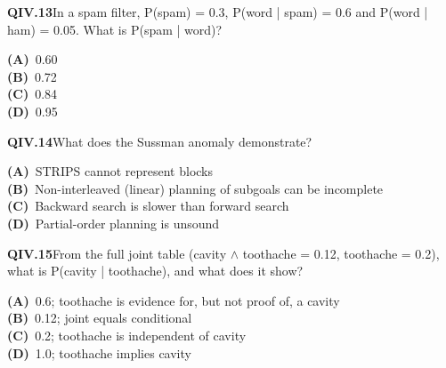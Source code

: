\begin{tcolorbox}[enhanced,breakable,colback=white,colframe=navyL,arc=2mm,boxrule=0.7pt,left=3mm,right=3mm,top=2mm,bottom=2mm]
\textbf{\color{navy}QIV.13}\quad In a spam filter, P(spam) = 0.3, P(word | spam) = 0.6 and P(word | ham) = 0.05. What is P(spam | word)?\hfill{}\par\smallskip
{\small \textbf{\color{navyL}(A)}\ 0.60\\[1pt]\textbf{\color{navyL}(B)}\ 0.72\\[1pt]\textbf{\color{navyL}(C)}\ 0.84\\[1pt]\textbf{\color{navyL}(D)}\ 0.95}
\end{tcolorbox}
\begin{tcolorbox}[enhanced,breakable,colback=white,colframe=navyL,arc=2mm,boxrule=0.7pt,left=3mm,right=3mm,top=2mm,bottom=2mm]
\textbf{\color{navy}QIV.14}\quad What does the Sussman anomaly demonstrate?\hfill{}\par\smallskip
{\small \textbf{\color{navyL}(A)}\ STRIPS cannot represent blocks\\[1pt]\textbf{\color{navyL}(B)}\ Non-interleaved (linear) planning of subgoals can be incomplete\\[1pt]\textbf{\color{navyL}(C)}\ Backward search is slower than forward search\\[1pt]\textbf{\color{navyL}(D)}\ Partial-order planning is unsound}
\end{tcolorbox}
\begin{tcolorbox}[enhanced,breakable,colback=white,colframe=navyL,arc=2mm,boxrule=0.7pt,left=3mm,right=3mm,top=2mm,bottom=2mm]
\textbf{\color{navy}QIV.15}\quad From the full joint table (cavity $\wedge$ toothache = 0.12, toothache = 0.2), what is P(cavity | toothache), and what does it show?\hfill{}\par\smallskip
{\small \textbf{\color{navyL}(A)}\ 0.6; toothache is evidence for, but not proof of, a cavity\\[1pt]\textbf{\color{navyL}(B)}\ 0.12; joint equals conditional\\[1pt]\textbf{\color{navyL}(C)}\ 0.2; toothache is independent of cavity\\[1pt]\textbf{\color{navyL}(D)}\ 1.0; toothache implies cavity}
\end{tcolorbox}
\newpage
